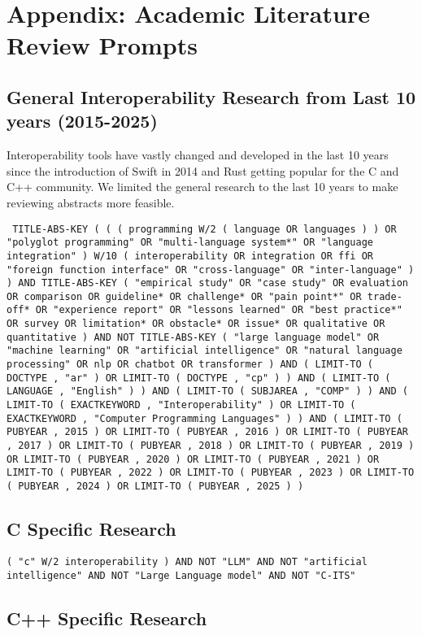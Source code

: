 \section{Appendix: Academic Literature Review Prompts}
\label{app:academic_literature_review}
\subsection{General Interoperability Research from Last 10 years (2015-2025)}
Interoperability tools have vastly changed and developed in the last 10 years since the introduction of Swift in 2014 and Rust getting popular for the C and C++ community. We limited the general research to the last 10 years to make reviewing abstracts more feasible.

\texttt{
TITLE-ABS-KEY ( ( ( programming W/2 ( language OR languages ) ) OR "polyglot programming" OR "multi-language system*" OR "language integration" ) W/10 ( interoperability OR integration OR ffi OR "foreign function interface" OR "cross-language" OR "inter-language" ) ) AND TITLE-ABS-KEY ( "empirical study" OR "case study" OR evaluation OR comparison OR guideline* OR challenge* OR "pain point*" OR trade-off* OR "experience report" OR "lessons learned" OR "best practice*" OR survey OR limitation* OR obstacle* OR issue* OR qualitative OR quantitative ) AND NOT TITLE-ABS-KEY ( "large language model" OR "machine learning" OR "artificial intelligence" OR "natural language processing" OR nlp OR chatbot OR transformer ) AND ( LIMIT-TO ( DOCTYPE , "ar" ) OR LIMIT-TO ( DOCTYPE , "cp" ) ) AND ( LIMIT-TO ( LANGUAGE , "English" ) ) AND ( LIMIT-TO ( SUBJAREA , "COMP" ) ) AND ( LIMIT-TO ( EXACTKEYWORD , "Interoperability" ) OR LIMIT-TO ( EXACTKEYWORD , "Computer Programming Languages" ) ) AND ( LIMIT-TO ( PUBYEAR , 2015 ) OR LIMIT-TO ( PUBYEAR , 2016 ) OR LIMIT-TO ( PUBYEAR , 2017 ) OR LIMIT-TO ( PUBYEAR , 2018 ) OR LIMIT-TO ( PUBYEAR , 2019 ) OR LIMIT-TO ( PUBYEAR , 2020 ) OR LIMIT-TO ( PUBYEAR , 2021 ) OR LIMIT-TO ( PUBYEAR , 2022 ) OR LIMIT-TO ( PUBYEAR , 2023 ) OR LIMIT-TO ( PUBYEAR , 2024 ) OR LIMIT-TO ( PUBYEAR , 2025 ) )}


\subsection{C Specific Research}

\texttt{( "c" W/2 interoperability ) AND NOT "LLM" AND NOT "artificial intelligence" AND NOT "Large Language model" AND NOT "C-ITS"
}

\subsection{C++ Specific Research}

